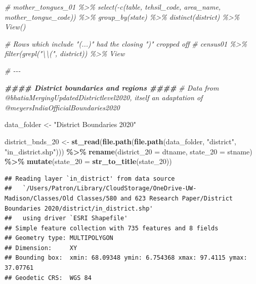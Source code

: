 \documentclass[
]{article}
\newenvironment{Shaded}{\begin{snugshade}}{\end{snugshade}}
\newcommand{\AttributeTok}[1]{\textcolor[rgb]{0.13,0.29,0.53}{#1}}
\newcommand{\CommentTok}[1]{\textcolor[rgb]{0.56,0.35,0.01}{\textit{#1}}}
\newcommand{\DocumentationTok}[1]{\textcolor[rgb]{0.56,0.35,0.01}{\textbf{\textit{#1}}}}
\newcommand{\FunctionTok}[1]{\textcolor[rgb]{0.13,0.29,0.53}{\textbf{#1}}}
\newcommand{\NormalTok}[1]{#1}
\newcommand{\OtherTok}[1]{\textcolor[rgb]{0.56,0.35,0.01}{#1}}
\newcommand{\SpecialCharTok}[1]{\textcolor[rgb]{0.81,0.36,0.00}{\textbf{#1}}}
\newcommand{\StringTok}[1]{\textcolor[rgb]{0.31,0.60,0.02}{#1}}
\begin{document}
\begin{Shaded}
\begin{Highlighting}[]
\CommentTok{\# mother\_tongues\_01 \%\textgreater{}\% select({-}c(table, tehsil\_code, area\_name, mother\_tongue\_code)) \%\textgreater{}\% group\_by(state) \%\textgreater{}\% distinct(district) \%\textgreater{}\% View()}


\CommentTok{\# Rows which include "(...)" had the closing ")" cropped off}
\CommentTok{\# census01 \%\textgreater{}\% filter(grepl("\textbackslash{}\textbackslash{}(", district)) \%\textgreater{}\% View}



\CommentTok{\# {-}{-}{-}}


\DocumentationTok{\#\#\#\# District boundaries and regions \#\#\#\#}
\CommentTok{\# Data from @bhatiaMergingUpdatedDistrictlevel2020, itself an adaptation of @meyersIndiaOfficialBoundaries2020}



\NormalTok{data\_folder }\OtherTok{\textless{}{-}} \StringTok{"District Boundaries 2020"}

\NormalTok{district\_bnds\_20 }\OtherTok{\textless{}{-}} \FunctionTok{st\_read}\NormalTok{(}\FunctionTok{file.path}\NormalTok{(}\FunctionTok{file.path}\NormalTok{(data\_folder, }\StringTok{"district"}\NormalTok{, }\StringTok{"in\_district.shp"}\NormalTok{))) }\SpecialCharTok{\%\textgreater{}\%} 
  \FunctionTok{rename}\NormalTok{(}\AttributeTok{district\_20 =}\NormalTok{ dtname, }
         \AttributeTok{state\_20 =}\NormalTok{ stname) }\SpecialCharTok{\%\textgreater{}\%} 
  \FunctionTok{mutate}\NormalTok{(}\AttributeTok{state\_20 =} \FunctionTok{str\_to\_title}\NormalTok{(state\_20))}
\end{Highlighting}
\end{Shaded}

\begin{verbatim}
## Reading layer `in_district' from data source 
##   `/Users/Patron/Library/CloudStorage/OneDrive-UW-Madison/Classes/Old Classes/580 and 623 Research Paper/District Boundaries 2020/district/in_district.shp' 
##   using driver `ESRI Shapefile'
## Simple feature collection with 735 features and 8 fields
## Geometry type: MULTIPOLYGON
## Dimension:     XY
## Bounding box:  xmin: 68.09348 ymin: 6.754368 xmax: 97.4115 ymax: 37.07761
## Geodetic CRS:  WGS 84
\end{verbatim}
\end{document}
